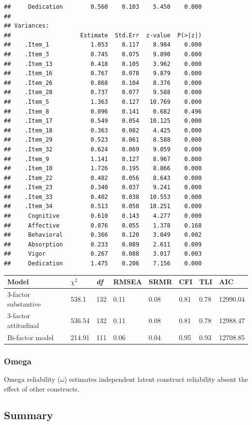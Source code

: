 \documentclass[
]{book}
\begin{document}
\begin{verbatim}
##     Dedication        0.560    0.103    5.450    0.000
## 
## Variances:
##                    Estimate  Std.Err  z-value  P(>|z|)
##    .Item_1            1.053    0.117    8.984    0.000
##    .Item_3            0.745    0.075    9.890    0.000
##    .Item_13           0.418    0.105    3.962    0.000
##    .Item_16           0.767    0.078    9.879    0.000
##    .Item_26           0.868    0.104    8.376    0.000
##    .Item_28           0.737    0.077    9.588    0.000
##    .Item_5            1.363    0.127   10.769    0.000
##    .Item_8            0.096    0.141    0.682    0.496
##    .Item_17           0.549    0.054   10.125    0.000
##    .Item_18           0.363    0.082    4.425    0.000
##    .Item_29           0.523    0.061    8.588    0.000
##    .Item_32           0.624    0.069    9.059    0.000
##    .Item_9            1.141    0.127    8.967    0.000
##    .Item_10           1.726    0.195    8.866    0.000
##    .Item_22           0.482    0.056    8.643    0.000
##    .Item_23           0.340    0.037    9.241    0.000
##    .Item_33           0.402    0.038   10.553    0.000
##    .Item_34           0.513    0.050   10.251    0.000
##     Cognitive         0.610    0.143    4.277    0.000
##     Affective         0.076    0.055    1.378    0.168
##     Behavioral        0.366    0.120    3.049    0.002
##     Absorption        0.233    0.089    2.611    0.009
##     Vigor             0.267    0.088    3.017    0.003
##     Dedication        1.475    0.206    7.156    0.000
\end{verbatim}

\begin{longtable}[]{@{}llllllll@{}}
\toprule
Model & \(\chi^2\) & \emph{df} & RMSEA & SRMR & CFI & TLI & AIC\tabularnewline
\midrule
\endhead
3-factor substantive & 538.1 & 132 & 0.11 & 0.08 & 0.81 & 0.78 & 12990.04\tabularnewline
3-factor attitudinal & 536.54 & 132 & 0.11 & 0.08 & 0.81 & 0.78 & 12988.47\tabularnewline
Bi-factor model & 214.91 & 111 & 0.06 & 0.04 & 0.95 & 0.93 & 12708.85\tabularnewline
\bottomrule
\end{longtable}

\hypertarget{omega}{%
\subsubsection{Omega}\label{omega}}

Omega reliability (\(\omega\)) estimates independent latent construct reliability absent the effect of other constructs.

\hypertarget{summary}{%
\subsection{Summary}\label{summary}}
\end{document}
